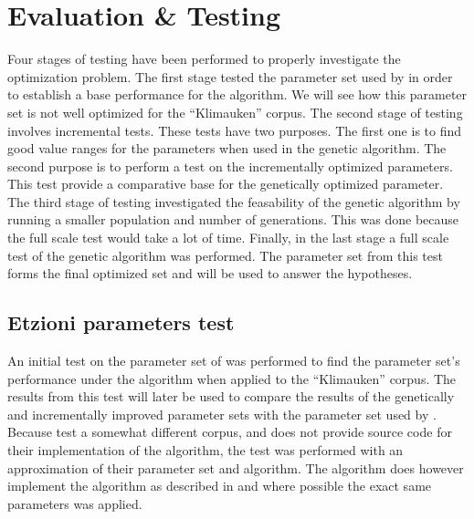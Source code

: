 
\chapter{Evaluation \& Testing} %

\label{EvaluationTesting} %



Four stages of testing have been performed to properly investigate the optimization problem. The first stage tested the parameter set used by \citeauthor{Oren1998} in order to establish a base performance for the algorithm. We will see how this parameter set is not well optimized for the ``Klimauken'' corpus. The second stage of testing involves incremental tests. These tests have two purposes. The first one is to find good value ranges for the parameters when used in the genetic algorithm. The second purpose is to perform a test on the incrementally optimized parameters. This test provide a comparative base for the genetically optimized parameter. The third stage of testing investigated the feasability of the genetic algorithm by running a smaller population and number of generations. This was done because the full scale test would take a lot of time. Finally, in the last stage a full scale test of the genetic algorithm was performed. The parameter set from this test forms the final optimized set and will be used to answer the hypotheses.

\section{Etzioni parameters test}
An initial test on the parameter set of \citeauthor{Oren1998} was performed to find the parameter set's performance under the \CTC algorithm when applied to the ``Klimauken'' corpus. The results from this test will later be used to compare the results of the genetically and incrementally improved parameter sets with the parameter set used by \citeauthor{Oren1998}. Because \citeauthor{Oren1998} test a somewhat different corpus, and does not provide source code for their implementation of the \STC algorithm, the test was performed with an approximation of their parameter set and algorithm. The \CTC algorithm does however implement the \STC algorithm as described in  and where possible the exact same parameters was applied.


